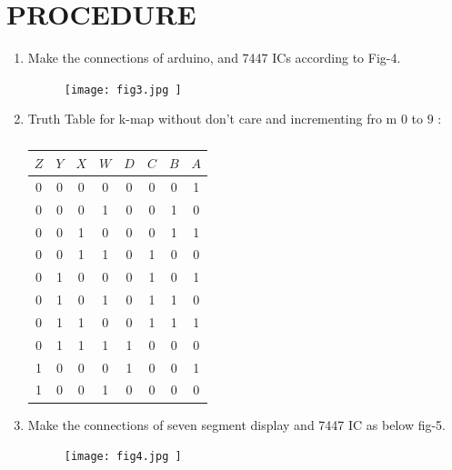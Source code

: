 \documentclass[conference]{IEEEtran}
\begin{document}
\section{PROCEDURE}


\begin{enumerate}

\item Make the connections of arduino, and  7447 ICs according to Fig-4.
	\begin{figure}[h] 
	\centering 
	\texttt{[image: fig3.jpg  ]}
	\caption{\label{fig-4:Gates}}    
\end{figure}

\item {Truth Table for k-map without don't care and incrementing fro    m $0$ to $9$ :  }
	\begin{table}[htbp]
		\centering
		\begin{tabular}
	{ | c | c | c | c | c | c | c | c | } 
	\hline
	$Z$ & $Y$ & $X$ & $W$ & $D$ & $C$ & $B$ & $A$\\
	\hline  
	0   & 0   & 0   & 0   & 0  & 0 & 0  & 1 \\                          0   & 0   & 0   & 1   & 0  & 0 & 1  & 0 \\
        0   & 0   & 1   & 0   & 0  & 0 & 1  & 1 \\                          0   & 0   & 1   & 1   & 0  & 1 & 0  & 0 \\
        0   & 1   & 0   & 0   & 0  & 1 & 0  & 1 \\                          0   & 1   & 0   & 1   & 0  & 1 & 1  & 0 \\                          0   & 1   & 1   & 0   & 0  & 1 & 1  & 1 \\                          0   & 1   & 1   & 1   & 1  & 0 & 0  & 0 \\                          1   & 0   & 0   & 0   & 1  & 0 & 0  & 1 \\                          1   & 0   & 0   & 1   & 0  & 0 & 0  & 0 \\   \hline
  \end{tabular}
  \vspace{0.1cm}
  \caption{\label{tab:widgets}}                                       \end{table}

\item Make the connections of seven segment display and 7447 IC as below fig-5.

\begin{figure}[h]                           
\centering                                 
\texttt{[image: fig4.jpg    ]}                                           
\caption{\label{fig-5:Gates}}               
\end{figure}



\end{enumerate}
\end{document}
